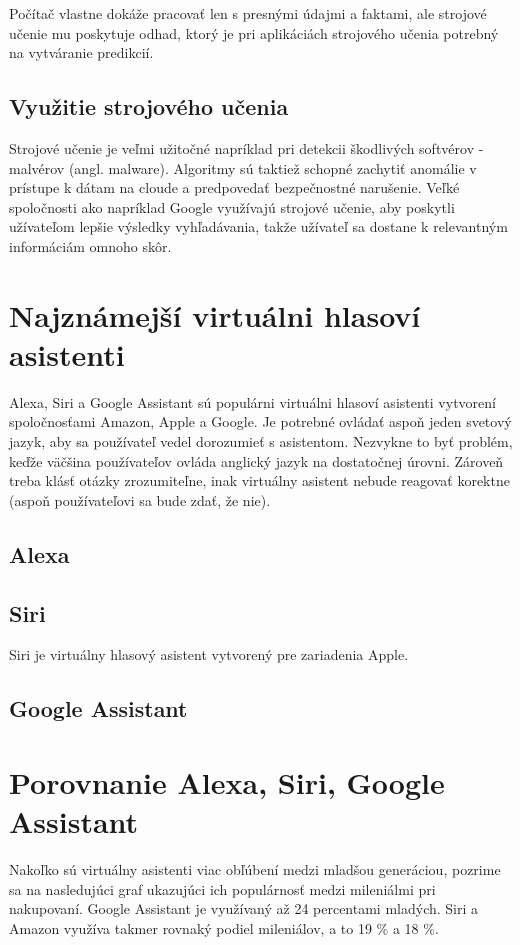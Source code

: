 \documentclass[10pt,twoside,slovak,coursepaper]{article}
\begin{document}
Počítač vlastne dokáže pracovať len s presnými údajmi a faktami, ale strojové učenie mu poskytuje odhad, ktorý je pri aplikáciách strojového učenia potrebný na vytváranie predikcií.

\subsection{Využitie strojového učenia}

Strojové  učenie je veľmi užitočné napríklad pri detekcii škodlivých softvérov - malvérov (angl. malware). Algoritmy sú taktiež schopné zachytiť anomálie v prístupe k dátam na cloude a predpovedať bezpečnostné narušenie. Veľké spoločnosti ako napríklad Google využívajú strojové učenie, aby poskytli užívateľom lepšie výsledky vyhľadávania, takže užívateľ sa dostane k relevantným informáciám omnoho skôr. \cite{Labus}

\section{Najznámejší virtuálni hlasoví asistenti}

Alexa, Siri a Google Assistant sú populárni virtuálni hlasoví asistenti vytvorení spoločnosťami Amazon, Apple a Google. Je potrebné ovládať aspoň jeden svetový jazyk, aby sa používateľ vedel dorozumieť s asistentom. Nezvykne to byť problém, keďže väčšina používateľov ovláda anglický jazyk na dostatočnej úrovni. Zároveň treba klásť otázky zrozumiteľne, inak virtuálny asistent nebude reagovať korektne (aspoň používateľovi sa bude zdať, že nie).\cite{Kadlec}

\subsection{Alexa}
\subsection{Siri}
Siri je virtuálny hlasový asistent vytvorený pre zariadenia Apple.\cite{Strephon}
\subsection{Google Assistant}
\section{Porovnanie Alexa, Siri, Google Assistant}
Nakoľko sú virtuálny asistenti viac obľúbení medzi mladšou generáciou, pozrime sa na nasledujúci graf ukazujúci ich populárnosť medzi mileniálmi pri nakupovaní. Google Assistant je využívaný až 24 percentami mladých. Siri a Amazon využíva takmer rovnaký podiel mileniálov, a to 19 \% a 18 \%. \cite{Kinsella}
\end{document}
